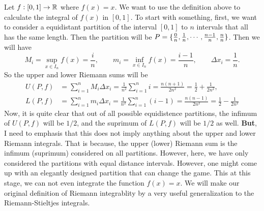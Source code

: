 \begin{example}[Attempting to integrate $f(x)=x$]
	Let $f: [0,1] \to \mathbb{R}$ where $f(x)=x$. We want to use the definition above to calculate the integral of $f(x)$ in $[0,1]$. To start with something, first, we want to consider a equidistant partition of the interval $[0,1]$ to $n$ intervals that all has the same length. Then the partition will be $P = \{\frac{0}{n},\frac{1}{n},\cdots,\frac{n-1}{n},\frac{n}{n}\}$. Then we will have
	\[ M_i = \sup_{x\in I_n} f(x) = \frac{i}{n}, \qquad m_i = \inf_{x\in I_n} f(x) = \frac{i-1}{n}, \qquad \Delta x_i = \frac{1}{n}. \]
	So the upper and lower Riemann sums will be
	\begin{align*}
		U(P,f) &= \sum_{i=1}^{n} M_i \Delta x_i = \frac{1}{n^2} \sum_{i=1}^{n}i = \frac{n(n+1)}{2n^2} = \frac{1}{2} + \frac{1}{2n^2}, \\
		L(P,f) &= \sum_{i=1}^{n} m_i \Delta x_i = \frac{1}{n^2} \sum_{i=1}^{n}(i-1) = \frac{n(n-1)}{2n^2} = \frac{1}{2} - \frac{1}{2n^2}
	\end{align*}
	Now, it is quite clear that out of all possible equidistence partitions, the infimum of $U(P,f)$ will be $1/2$, and the suprimum of $L(P,f)$ will be $1/2$ as well. \textbf{But}, I need to emphasis that this does not imply anything about the upper and lower Riemann integrals. That is because, the upper (lower) Riemann sum is the infimum (suprimum) considered on all partitions. However, here, we have only considered the partitions with equal distance intervals. However, one might come up with an elegantly designed partition that can change the game. This at this stage, we can not even integrate the function $f(x) = x$. We will make our original definition of Riemann integrablity by a very useful generalization to the Riemann-Stieltjes integrals.
\end{example}

